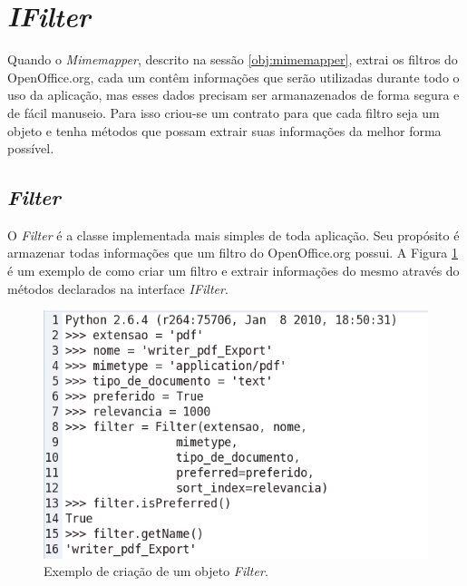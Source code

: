 \section{\textit{IFilter}}
\label{interface:filter}

Quando o \textit{Mimemapper}, descrito na sessão \ref{obj:mimemapper}, extrai os filtros do OpenOffice.org, cada um contêm informações que serão utilizadas durante todo o uso da aplicação, mas esses dados precisam ser armanazenados de forma segura e de fácil manuseio. Para isso criou-se um contrato para que cada filtro seja um objeto e tenha métodos que possam extrair suas informações da melhor forma possível.

\subsection{\textit{Filter}}
\label{obj:filter}
O \textit{Filter} é a classe implementada mais simples de toda aplicação. Seu propósito é armazenar todas informações que um filtro do OpenOffice.org possui. A Figura \ref{fig:type} é um exemplo de como criar um filtro e extrair informações do mesmo através do métodos declarados na interface \textit{IFilter}.

\begin{figure}[!ht]
\centering
\begin{center}
\includegraphics[scale=0.710,bb=0 0 500 250]{exemplo_filter.png}
\end{center}
\caption{Exemplo de criação de um objeto \textit{Filter}.}
\label{fig:type}
\end{figure}